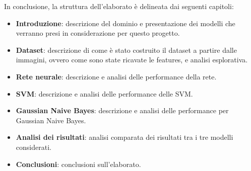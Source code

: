 In conclusione, la struttura dell'elaborato è delineata dai seguenti capitoli:
\begin{itemize}
    \item \textbf{Introduzione}: descrizione del dominio e presentazione dei modelli che 
    verranno presi in considerazione per questo progetto.
    \item \textbf{Dataset}: descrizione di come è stato costruito il dataset a partire
    dalle immagini, ovvero come sono state ricavate le features, e analisi esplorativa.
    \item \textbf{Rete neurale}: descrizione e analisi delle performance della rete.
    \item \textbf{SVM}: descrizione e analisi delle performance delle SVM.
    \item \textbf{Gaussian Naive Bayes}: descrizione e analisi delle performance 
    per Gaussian Naive Bayes.
    \item \textbf{Analisi dei risultati}: analisi comparata dei risultati tra i 
    tre modelli considerati.
    \item \textbf{Conclusioni}: conclusioni sull'elaborato.
\end{itemize}